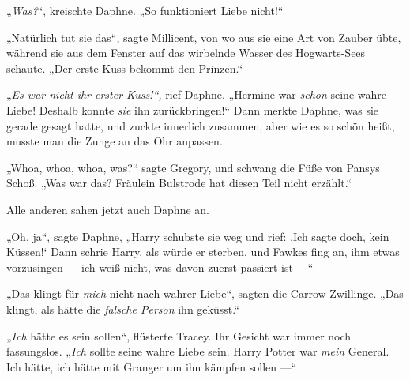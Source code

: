 „\emph{Was?}“, kreischte Daphne.
„So funktioniert Liebe nicht!“

„Natürlich tut sie das“, sagte Millicent, von wo aus sie eine Art von Zauber übte, während sie aus dem Fenster auf das wirbelnde Wasser des Hogwarts-Sees schaute.
„Der erste Kuss bekommt den Prinzen.“

„\emph{Es war nicht ihr erster Kuss!“,} rief Daphne.
„Hermine war \emph{schon} seine wahre Liebe! Deshalb konnte \emph{sie} ihn zurückbringen!“ Dann merkte Daphne, was sie gerade gesagt hatte, und zuckte innerlich zusammen, aber wie es so schön heißt, musste man die Zunge an das Ohr anpassen.

„Whoa, whoa, whoa, was?“ sagte Gregory, und schwang die Füße von Pansys Schoß.
„Was war das? Fräulein Bulstrode hat diesen Teil nicht erzählt.“

Alle anderen sahen jetzt auch Daphne an.

„Oh, ja“, sagte Daphne,
„Harry schubste sie weg und rief: ‚Ich sagte doch, kein Küssen!‘ Dann schrie Harry, als würde er sterben, und Fawkes fing an, ihm etwas vorzusingen — ich weiß nicht, was davon zuerst passiert ist —“

„Das klingt für \emph{mich} nicht nach wahrer Liebe“, sagten die Carrow-Zwillinge.
„Das klingt, als hätte die \emph{falsche Person} ihn geküsst.“

„\emph{Ich} hätte es sein sollen“, flüsterte Tracey. Ihr Gesicht war immer noch fassungslos.
„\emph{Ich} sollte seine wahre Liebe sein. Harry Potter war \emph{mein} General. Ich hätte, ich hätte mit Granger um ihn kämpfen sollen —“

